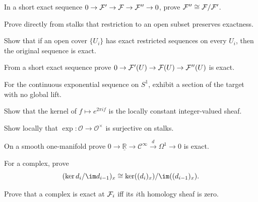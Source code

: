 \begin{exercise}\label{ex:vi16-11}
In a short exact sequence $0\to\mathcal F'\to\mathcal F\to\mathcal F''\to0$, prove $\mathcal F''\cong\mathcal F/\mathcal F'$.
\end{exercise}

\begin{exercise}[Restriction]\label{ex:vi16-12}
Prove directly from stalks that restriction to an open subset preserves exactness.
\end{exercise}

\begin{exercise}\label{ex:vi16-13}
Show that if an open cover $\{U_i\}$ has exact restricted sequences on every $U_i$, then the original sequence is exact.
\end{exercise}

\begin{exercise}\label{ex:vi16-14}
From a short exact sequence prove $0\to\mathcal F'(U)\to\mathcal F(U)\to\mathcal F''(U)$ is exact.
\end{exercise}

\begin{exercise}\label{ex:vi16-15}
For the continuous exponential sequence on $S^1$, exhibit a section of the target with no global lift.
\end{exercise}

\begin{exercise}\label{ex:vi16-16}
Show that the kernel of $f\mapsto e^{2\pi i f}$ is the locally constant integer-valued sheaf.
\end{exercise}

\begin{exercise}\label{ex:vi16-17}
Show locally that $\exp:\mathcal O\to\mathcal O^\times$ is surjective on stalks.
\end{exercise}

\begin{exercise}\label{ex:vi16-18}
On a smooth one-manifold prove $0\to\underline{\mathbb R}\to\mathcal C^\infty\xrightarrow{d}\Omega^1\to0$ is exact.
\end{exercise}

\begin{exercise}\label{ex:vi16-19}
For a complex, prove
\[
(\ker d_i/\im d_{i-1})_x\cong\ker((d_i)_x)/\im((d_{i-1})_x).
\]
\end{exercise}

\begin{exercise}\label{ex:vi16-20}
Prove that a complex is exact at $\mathcal F_i$ iff its $i$th homology sheaf is zero.
\end{exercise}

